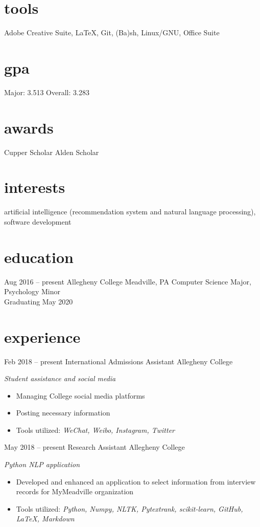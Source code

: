 \documentclass[]{friggeri-cv}
\begin{document}
\begin{aside}
  \section{tools}\vspace{0.05cm}
    Adobe Creative Suite, \LaTeX, Git, (Ba)sh, Linux/GNU, Office Suite
  \section{gpa}\vspace{0.1cm}
  	Major: 3.513
    Overall: 3.283\vspace{0.1cm}
  \section{awards}\vspace{0.05cm}
  Cupper Scholar\vspace{0.1cm}
  Alden Scholar\vspace{0.1cm}
\end{aside}

\section{interests}

artificial intelligence (recommendation system and natural language processing), software development

\section{education}
\begin{entrylist}
  \entry
    {Aug 2016 -- present}
    {Allegheny College}
    {Meadville, PA}
    {Computer Science Major, Psychology Minor\\Graduating May 2020}
\end{entrylist}
\section{experience}
\begin{entrylist}
  \entry
    {Feb 2018 -- present}
    {International Admissions Assistant}
    {Allegheny College}
    {\emph{Student assistance and social media}
    \begin{itemize}[leftmargin=1.2em]
    \item Managing College social media platforms
    \item Posting necessary information
    \item Tools utilized: \emph{WeChat, Weibo, Instagram, Twitter}
    \end{itemize}}
  \entry
    {May 2018 -- present}
    {Research Assistant}
    {Allegheny College}
    {\emph{Python NLP application}
    \begin{itemize}[leftmargin=1.2em]
    \item Developed and enhanced an application to select information from interview records for MyMeadville organization
    \item Tools utilized: \emph{Python, Numpy, NLTK, Pytextrank, scikit-learn, GitHub, \LaTeX, Markdown}
    \end{itemize}}
\end{entrylist}
\end{document}
